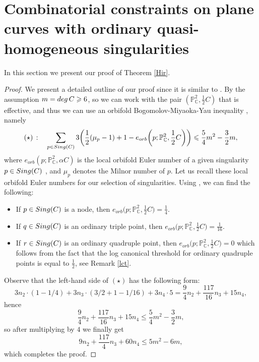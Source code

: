 \documentclass[12pt]{article}
\theoremstyle{plain}
\theoremstyle{definition}
\renewcommand\geq{\geqslant}
\renewcommand\leq{\leqslant}
\begin{document}
\section{Combinatorial constraints on plane curves with ordinary quasi-homogeneous singularities}
In this section we present our proof of Theorem \ref{Hir}.
\begin{proof}
We present a detailed outline of our proof since it is similar to \cite[Theorem B]{Pokora}. By the assumption $m= {\rm deg} \, C \geq 6$, so we can work with the pair $(\mathbb{P}^{2}_{\mathbb{C}}, \frac{1}{2}C)$ that is effective, and thus we can use an orbifold Bogomolov-Miyaoka-Yau inequality \cite[Section 11]{Langer}, namely
$$(\star) \, : \quad \sum_{p \in {\rm Sing}(C)} 3\bigg( \frac{1}{2}(\mu_{p}-1)+1-e_{orb}\bigg(p;\mathbb{P}^{2}_{\mathbb{C}}, \frac{1}{2} C\bigg)\bigg)\leq  \frac{5}{4}m^{2}- \frac{3}{2}m,$$
where $e_{orb}(p;\mathbb{P}^{2}_{\mathbb{C}},\alpha C)$ is the local orbifold Euler number of a given singularity $p \in {\rm Sing}(C)$ \cite[Definition 3.1]{Langer}, and $\mu_{p}$ denotes the Milnor number of $p$. Let us recall these local orbifold Euler numbers for our selection of singularities. Using \cite[Theorem 8.7, Theorem 9.4.2]{Langer}, we can find the following:
\begin{itemize}
\item If $p \in {\rm Sing}(C)$ is a node, then $e_{orb}\bigg(p;\mathbb{P}^{2}_{\mathbb{C}}, \frac{1}{2} C\bigg) = \frac{1}{4}$.
\item If $q \in {\rm Sing}(C)$ is an ordinary triple point, then $e_{orb}\bigg(p;\mathbb{P}^{2}_{\mathbb{C}}, \frac{1}{2} C\bigg) = \frac{1}{16}$.
\item If $r \in {\rm Sing}(C)$ is an ordinary quadruple point, then $e_{orb}\bigg(p;\mathbb{P}^{2}_{\mathbb{C}}, \frac{1}{2} C\bigg) = 0$ which follows from the fact that the log canonical threshold for ordinary quadruple points is equal to $\frac{1}{2}$, see Remark \ref{lct}.
\end{itemize}
Observe that the left-hand side of $(\star)$ has the following form:
$$3n_{2}\cdot(1 - 1/4) + 3n_{3}\cdot(3/2 + 1 - 1/16) + 3n_{4}\cdot 5 = \frac{9}{4}n_{2} + \frac{117}{16}n_{3} + 15n_{4},$$
hence
$$\frac{9}{4}n_{2} + \frac{117}{16}n_{3} + 15n_{4} \leq \frac{5}{4}m^{2} - \frac{3}{2}m,$$
so after multiplying by $4$ we finally get
$$9n_{2} + \frac{117}{4}n_{3} + 60n_{4} \leq 5m^{2}-6m,$$
which completes the proof.
\end{proof}
\end{document}
